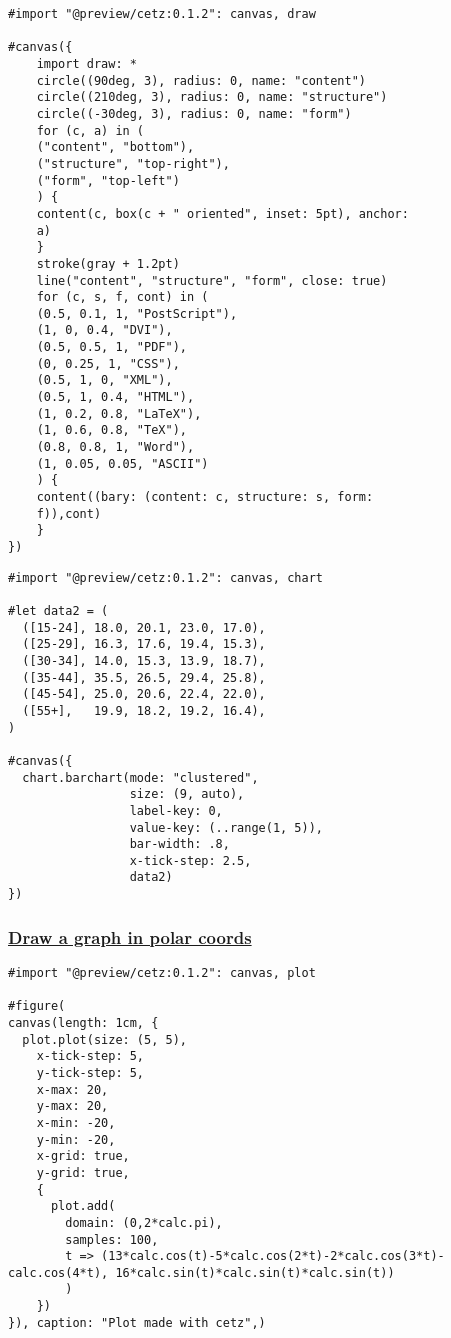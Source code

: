 \begin{verbatim}
#import "@preview/cetz:0.1.2": canvas, draw

#canvas({
    import draw: *
    circle((90deg, 3), radius: 0, name: "content")
    circle((210deg, 3), radius: 0, name: "structure")
    circle((-30deg, 3), radius: 0, name: "form")
    for (c, a) in (
    ("content", "bottom"),
    ("structure", "top-right"),
    ("form", "top-left")
    ) {
    content(c, box(c + " oriented", inset: 5pt), anchor:
    a)
    }
    stroke(gray + 1.2pt)
    line("content", "structure", "form", close: true)
    for (c, s, f, cont) in (
    (0.5, 0.1, 1, "PostScript"),
    (1, 0, 0.4, "DVI"),
    (0.5, 0.5, 1, "PDF"),
    (0, 0.25, 1, "CSS"),
    (0.5, 1, 0, "XML"),
    (0.5, 1, 0.4, "HTML"),
    (1, 0.2, 0.8, "LaTeX"),
    (1, 0.6, 0.8, "TeX"),
    (0.8, 0.8, 1, "Word"),
    (1, 0.05, 0.05, "ASCII")
    ) {
    content((bary: (content: c, structure: s, form:
    f)),cont)
    }
})
\end{verbatim}

\pandocbounded{}

\begin{verbatim}
#import "@preview/cetz:0.1.2": canvas, chart

#let data2 = (
  ([15-24], 18.0, 20.1, 23.0, 17.0),
  ([25-29], 16.3, 17.6, 19.4, 15.3),
  ([30-34], 14.0, 15.3, 13.9, 18.7),
  ([35-44], 35.5, 26.5, 29.4, 25.8),
  ([45-54], 25.0, 20.6, 22.4, 22.0),
  ([55+],   19.9, 18.2, 19.2, 16.4),
)

#canvas({
  chart.barchart(mode: "clustered",
                 size: (9, auto),
                 label-key: 0,
                 value-key: (..range(1, 5)),
                 bar-width: .8,
                 x-tick-step: 2.5,
                 data2)
})
\end{verbatim}

\pandocbounded{}

\subsubsection{\texorpdfstring{\hyperref[draw-a-graph-in-polar-coords]{Draw
a graph in polar
coords}}{Draw a graph in polar coords}}\label{draw-a-graph-in-polar-coords}

\begin{verbatim}
#import "@preview/cetz:0.1.2": canvas, plot

#figure(
canvas(length: 1cm, {
  plot.plot(size: (5, 5),
    x-tick-step: 5,
    y-tick-step: 5,
    x-max: 20,
    y-max: 20,
    x-min: -20,
    y-min: -20,
    x-grid: true,
    y-grid: true,
    {
      plot.add(
        domain: (0,2*calc.pi),
        samples: 100,
        t => (13*calc.cos(t)-5*calc.cos(2*t)-2*calc.cos(3*t)-calc.cos(4*t), 16*calc.sin(t)*calc.sin(t)*calc.sin(t))
        )
    })
}), caption: "Plot made with cetz",)
\end{verbatim}

